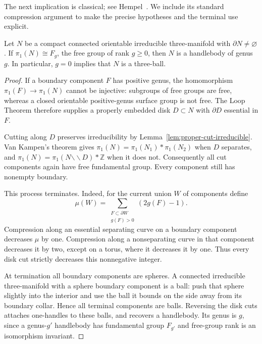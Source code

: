 The next implication is classical; see Hempel~\cite{Hempel1976}.  We
include its standard compression argument to make the precise hypotheses
and the terminal use explicit.

\begin{proposition}
\label{prop:free-group-handlebody}
Let $N$ be a compact connected orientable irreducible three-manifold with
$\partial N\ne\varnothing$.  If $\pi_1(N)\cong F_g$, the free group of
rank $g\ge0$, then $N$ is a handlebody of genus $g$.  In particular,
$g=0$ implies that $N$ is a three-ball.
\end{proposition}
\begin{proof}
If a boundary component $F$ has positive genus, the homomorphism
$\pi_1(F)\to\pi_1(N)$ cannot be injective: subgroups of free groups are
free, whereas a closed orientable positive-genus surface group is not
free.  The Loop Theorem therefore supplies a properly embedded disk
$D\subset N$ with $\partial D$ essential in $F$.

Cutting along $D$ preserves irreducibility by
Lemma~\ref{lem:proper-cut-irreducible}.  Van Kampen's theorem gives
$\pi_1(N)=\pi_1(N_1)*\pi_1(N_2)$ when $D$ separates, and
$\pi_1(N)=\pi_1(N\mathbin{\backslash\!\backslash}D)*\mathbb Z$ when
it does not.  Consequently all cut components again have free
fundamental group.  Every component still has nonempty boundary.

This process terminates.  Indeed, for the current union $W$ of components
define
\[
 \mu(W)=\sum_{\substack{F\subset\partial W\\g(F)>0}}(2g(F)-1).
\]
Compression along an essential separating curve on a boundary component
decreases $\mu$ by one.  Compression along a nonseparating curve in that
component decreases it by two, except on a torus, where it decreases it
by one.  Thus every
disk cut strictly decreases this nonnegative integer.

At termination all boundary components are spheres.  A connected
irreducible three-manifold with a sphere boundary component is a ball:
push that sphere slightly into the interior and use the ball it bounds
on the side away from its boundary collar.  Hence all terminal components
are balls.  Reversing the disk cuts attaches one-handles to these balls,
and recovers a handlebody.  Its genus is $g$, since a genus-$g'$ handlebody
has fundamental group $F_{g'}$ and free-group rank is an isomorphism
invariant.
\end{proof}


